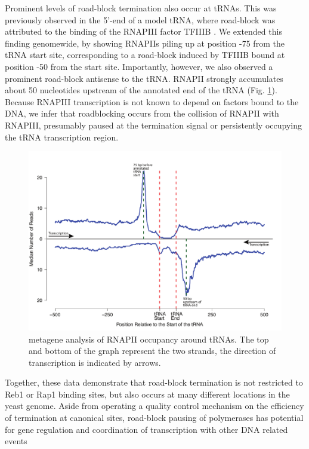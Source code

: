 Prominent levels of road-block termination also occur at tRNAs. This was previously observed in the 5’-end of a model tRNA, where road-block was attributed to the binding of the RNAPIII factor TFIIIB \cite{korde:2014:intergenic}. We extended this finding genomewide, by showing RNAPIIs piling up at position -75 from the tRNA start site, corresponding to a road-block induced by TFIIIB bound at position -50 from the start site. Importantly, however, we also observed a prominent road-block antisense to the tRNA. RNAPII strongly accumulates about 50 nucleotides upstream of the annotated end of the tRNA (Fig. \ref{fig:eleven}). Because RNAPIII transcription is not known to depend on factors bound to the DNA, we infer that roadblocking occurs from the collision of RNAPII with RNAPIII, presumably paused at the termination signal or persistently occupying the tRNA transcription region. 

\begin{figure}[h]

\centering
\includegraphics[width=\textwidth]{figures/results/rap/eleven.pdf}
\caption[metagene analysis of RNAPII occupancy around tRNAs]{metagene analysis of RNAPII occupancy around tRNAs. The top and bottom of the graph represent the two strands, the direction of transcription is indicated by arrows.}
\label{fig:eleven}

\end{figure}

Together, these data demonstrate that road-block termination is not restricted to Reb1 or Rap1 binding sites, but also occurs at many different locations in the yeast genome. Aside from operating a quality control mechanism on the efficiency of termination at canonical sites, road-block pausing of polymerases has potential for gene regulation and coordination of transcription with other DNA related events





